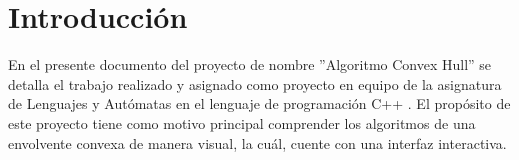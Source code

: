 \documentclass[conference]{IEEEtran}
\begin{document}

\section{Introducción}

En el presente documento del proyecto de nombre ''Algoritmo Convex Hull'' se detalla el trabajo realizado y asignado como proyecto en equipo de la asignatura de Lenguajes y Autómatas en el lenguaje de programación C++ \cite{cpp}. El propósito de este proyecto tiene como motivo principal comprender los algoritmos de una envolvente convexa de manera visual, la cuál, cuente con una interfaz interactiva\cite{ui}.
\end{document}
